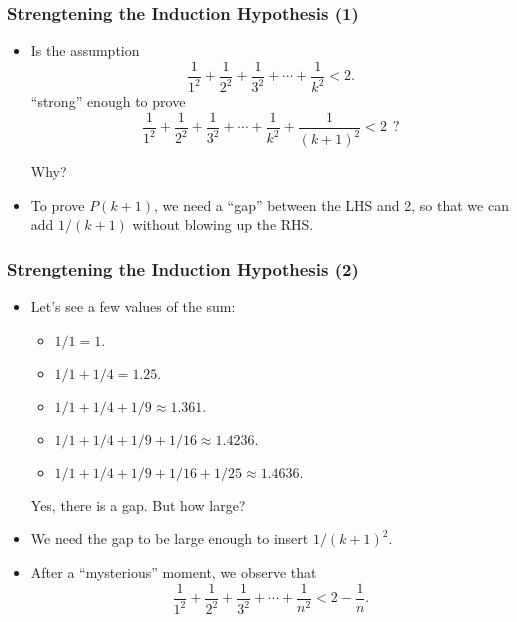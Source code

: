 \begin{frame}\frametitle{Strengtening the Induction Hypothesis (1)}
  \begin{itemize}
  \item
    Is the assumption
    \[ \frac{1}{1^2} + \frac{1}{2^2} + \frac{1}{3^2} + \cdots +\frac{1}{k^2} < 2.\]
    ``strong'' enough to prove
    \[ \frac{1}{1^2} + \frac{1}{2^2} + \frac{1}{3^2} + \cdots +\frac{1}{k^2}+\frac{1}{(k+1)^2} < 2 \ \ ?\]

    Why?
    \pause
    
  \item To prove $P(k+1)$, we need a ``gap'' between the LHS and 2, so
    that we can add $1/(k+1)$ without blowing up the RHS.
  \end{itemize}
\end{frame}

\begin{frame}\frametitle{Strengtening the Induction Hypothesis (2)}
  \begin{itemize}
  \item Let's see a few values of the sum:
    \begin{itemize}
    \item $1/1 = 1.$ \pause
    \item $1/1 + 1/4 = 1.25.$ \pause
    \item $1/1 + 1/4 + 1/9 \approx 1.361.$ \pause
    \item $1/1 + 1/4 + 1/9 + 1/16 \approx 1.4236.$ \pause
    \item $1/1 + 1/4 + 1/9 + 1/16 + 1/25 \approx 1.4636.$
    \end{itemize}
    Yes, there is a gap.  But how large?
    \pause
    
  \item We need the gap to be large enough to insert $1/(k+1)^2$.
    \pause
  \item After a ``mysterious'' moment, we observe that
    \[ \frac{1}{1^2} + \frac{1}{2^2} + \frac{1}{3^2} + \cdots +\frac{1}{n^2} < 2 - \frac{1}{n}.\]
  \end{itemize}
\end{frame}

